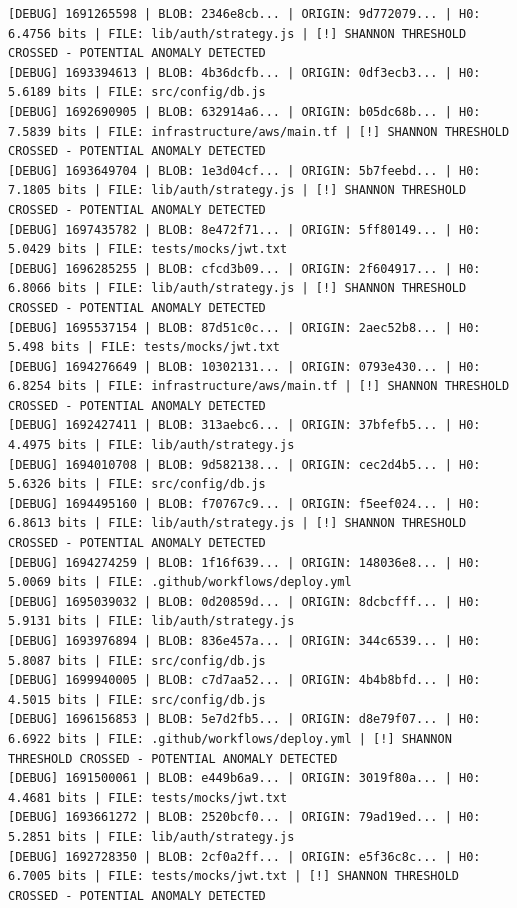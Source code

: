 \documentclass[12pt, a4paper, oneside]{report}
\begin{document}
\begin{lstlisting}[basicstyle=\tiny\ttfamily]
[DEBUG] 1691265598 | BLOB: 2346e8cb... | ORIGIN: 9d772079... | H0: 6.4756 bits | FILE: lib/auth/strategy.js | [!] SHANNON THRESHOLD CROSSED - POTENTIAL ANOMALY DETECTED
[DEBUG] 1693394613 | BLOB: 4b36dcfb... | ORIGIN: 0df3ecb3... | H0: 5.6189 bits | FILE: src/config/db.js
[DEBUG] 1692690905 | BLOB: 632914a6... | ORIGIN: b05dc68b... | H0: 7.5839 bits | FILE: infrastructure/aws/main.tf | [!] SHANNON THRESHOLD CROSSED - POTENTIAL ANOMALY DETECTED
[DEBUG] 1693649704 | BLOB: 1e3d04cf... | ORIGIN: 5b7feebd... | H0: 7.1805 bits | FILE: lib/auth/strategy.js | [!] SHANNON THRESHOLD CROSSED - POTENTIAL ANOMALY DETECTED
[DEBUG] 1697435782 | BLOB: 8e472f71... | ORIGIN: 5ff80149... | H0: 5.0429 bits | FILE: tests/mocks/jwt.txt
[DEBUG] 1696285255 | BLOB: cfcd3b09... | ORIGIN: 2f604917... | H0: 6.8066 bits | FILE: lib/auth/strategy.js | [!] SHANNON THRESHOLD CROSSED - POTENTIAL ANOMALY DETECTED
[DEBUG] 1695537154 | BLOB: 87d51c0c... | ORIGIN: 2aec52b8... | H0: 5.498 bits | FILE: tests/mocks/jwt.txt
[DEBUG] 1694276649 | BLOB: 10302131... | ORIGIN: 0793e430... | H0: 6.8254 bits | FILE: infrastructure/aws/main.tf | [!] SHANNON THRESHOLD CROSSED - POTENTIAL ANOMALY DETECTED
[DEBUG] 1692427411 | BLOB: 313aebc6... | ORIGIN: 37bfefb5... | H0: 4.4975 bits | FILE: lib/auth/strategy.js
[DEBUG] 1694010708 | BLOB: 9d582138... | ORIGIN: cec2d4b5... | H0: 5.6326 bits | FILE: src/config/db.js
[DEBUG] 1694495160 | BLOB: f70767c9... | ORIGIN: f5eef024... | H0: 6.8613 bits | FILE: lib/auth/strategy.js | [!] SHANNON THRESHOLD CROSSED - POTENTIAL ANOMALY DETECTED
[DEBUG] 1694274259 | BLOB: 1f16f639... | ORIGIN: 148036e8... | H0: 5.0069 bits | FILE: .github/workflows/deploy.yml
[DEBUG] 1695039032 | BLOB: 0d20859d... | ORIGIN: 8dcbcfff... | H0: 5.9131 bits | FILE: lib/auth/strategy.js
[DEBUG] 1693976894 | BLOB: 836e457a... | ORIGIN: 344c6539... | H0: 5.8087 bits | FILE: src/config/db.js
[DEBUG] 1699940005 | BLOB: c7d7aa52... | ORIGIN: 4b4b8bfd... | H0: 4.5015 bits | FILE: src/config/db.js
[DEBUG] 1696156853 | BLOB: 5e7d2fb5... | ORIGIN: d8e79f07... | H0: 6.6922 bits | FILE: .github/workflows/deploy.yml | [!] SHANNON THRESHOLD CROSSED - POTENTIAL ANOMALY DETECTED
[DEBUG] 1691500061 | BLOB: e449b6a9... | ORIGIN: 3019f80a... | H0: 4.4681 bits | FILE: tests/mocks/jwt.txt
[DEBUG] 1693661272 | BLOB: 2520bcf0... | ORIGIN: 79ad19ed... | H0: 5.2851 bits | FILE: lib/auth/strategy.js
[DEBUG] 1692728350 | BLOB: 2cf0a2ff... | ORIGIN: e5f36c8c... | H0: 6.7005 bits | FILE: tests/mocks/jwt.txt | [!] SHANNON THRESHOLD CROSSED - POTENTIAL ANOMALY DETECTED

\end{lstlisting}
\end{document}
